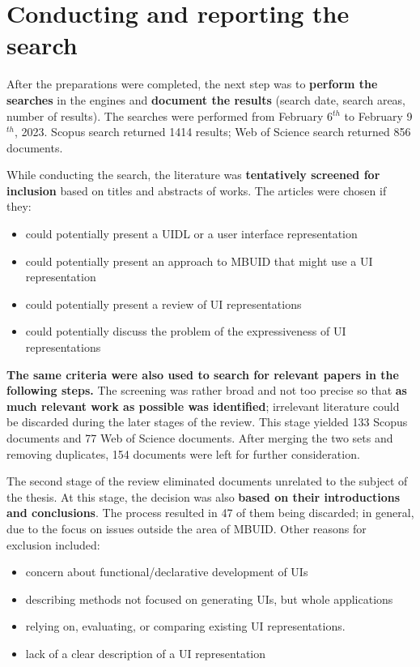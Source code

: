 \section{Conducting and reporting the search}\label{sec:conducting-and-reporting-the-search}

After the preparations were completed, the next step was to \textbf{perform the searches} in the engines and \textbf{document the results} (search date, search areas, number of results).
The searches were performed from February 6$^{th}$ to February 9$^{th}$, 2023.
Scopus search returned 1414 results;
Web of Science search returned 856 documents.

\begin{samepage}
While conducting the search, the literature was \textbf{tentatively screened for inclusion} based on titles and abstracts of works.
The articles were chosen if they:
    \begin{itemize}
        \item could potentially present a UIDL or a user interface representation
        \item could potentially present an approach to MBUID that might use a UI representation
        \item could potentially present a review of UI representations
        \item could potentially discuss the problem of the expressiveness of UI representations
    \end{itemize}
\end{samepage}
\textbf{The same criteria were also used to search for relevant papers in the following steps.}
The screening was rather broad and not too precise so that \textbf{as much relevant work as possible was identified};
irrelevant literature could be discarded during the later stages of the review.
This stage yielded 133 Scopus documents and 77 Web of Science documents.
After merging the two sets and removing duplicates, 154 documents were left for further consideration.

The second stage of the review eliminated documents unrelated to the subject of the thesis.
At this stage, the decision was also \textbf{based on their introductions and conclusions}.
The process resulted in 47 of them being discarded; in general, due to the focus on issues outside the area of MBUID\@.
Other reasons for exclusion included:
\begin{itemize}
    \item concern about functional/declarative development of UIs
    \item describing methods not focused on generating UIs, but whole applications
    \item relying on, evaluating, or comparing existing UI representations.
    \item lack of a clear description of a UI representation
\end{itemize}

